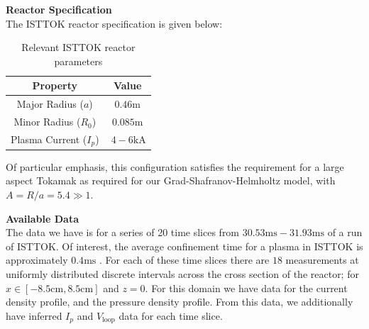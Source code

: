 \noindent\textbf{Reactor Specification}\\
The ISTTOK reactor specification is given below:

\begin{table}[h!]
    \centering
    \begin{tabular}{|c|c|}
    \hline
    Property           & Value                                                 \\ \hline
    Major Radius ($a$)       & $0.46\text{m}$                                                 \\ \hline
    Minor Radius ($R_0$)      & $0.085\text{m}$                                              \\ \hline
    Plasma Current ($I_p$)   & $~4-6\text{kA}$ \\ \hline
    \end{tabular}
    \caption{Relevant ISTTOK reactor parameters \cite{malaquias-matthew}}
\end{table}

Of particular emphasis, this configuration satisfies the requirement for a large aspect Tokamak as required for 
our Grad-Shafranov-Helmholtz model, with $A = R / a = 5.4 \gg 1$.

\noindent\textbf{Available Data}\\
\noindent
The data we have is for a series of 20 time slices from $30.53\text{ms} - 31.93\text{ms}$ of 
a run of ISTTOK. Of interest, the average confinement time for a plasma in ISTTOK is approximately
$0.4\text{ms}$ \cite{malaquias-matthew}. For each of these time slices there are $18$ 
measurements at uniformly distributed discrete intervals across the cross section of the reactor; 
for $x \in [-8.5\text{cm}, 8.5\text{cm}]$ and $z = 0$. For this domain we have data for the 
current density profile, and the pressure density profile. From this data, we additionally have inferred $I_p$ and $V_{\text{loop}}$ data for each time slice.

